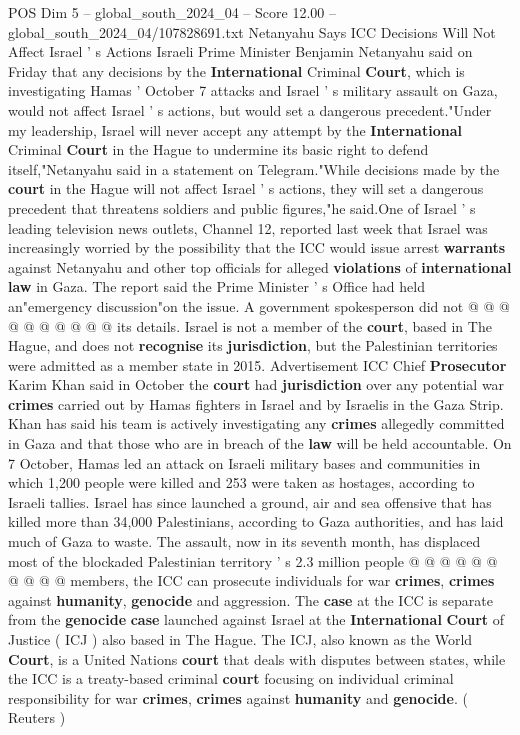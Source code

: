 \begin{textsample}{POS Dim 5 – global\_south\_2024\_04 – Score 12.00 – global\_south\_2024\_04/107828691.txt}  \label{ex:f5_pos_272}
Netanyahu Says ICC Decisions Will Not Affect Israel ' s Actions Israeli Prime Minister Benjamin Netanyahu said on Friday that any decisions by the \textbf{International} Criminal \textbf{Court}, which is investigating Hamas ' October 7 attacks and Israel ' s military assault on Gaza, would not affect Israel ' s actions, but would set a dangerous precedent."Under my leadership, Israel will never accept any attempt by the \textbf{International} Criminal \textbf{Court} in the Hague to undermine its basic right to defend itself,"Netanyahu said in a statement on Telegram."While decisions made by the \textbf{court} in the Hague will not affect Israel ' s actions, they will set a dangerous precedent that threatens soldiers and public figures,"he said.One of Israel ' s leading television news outlets, Channel 12, reported last week that Israel was increasingly worried by the possibility that the ICC would issue arrest \textbf{warrants} against Netanyahu and other top officials for alleged \textbf{violations} of \textbf{international} \textbf{law} in Gaza.
The report said the Prime Minister ' s Office had held an"emergency discussion"on the issue.
A government spokesperson did not @ @ @ @ @ @ @ @ @ @ its details.
Israel is not a member of the \textbf{court}, based in The Hague, and does not \textbf{recognise} its \textbf{jurisdiction}, but the Palestinian territories were admitted as a member state in 2015.
Advertisement ICC Chief \textbf{Prosecutor} Karim Khan said in October the \textbf{court} had \textbf{jurisdiction} over any potential war \textbf{crimes} carried out by Hamas fighters in Israel and by Israelis in the Gaza Strip.
Khan has said his team is actively investigating any \textbf{crimes} allegedly committed in Gaza and that those who are in breach of the \textbf{law} will be held accountable.
On 7 October, Hamas led an attack on Israeli military bases and communities in which 1,200 people were killed and 253 were taken as hostages, according to Israeli tallies.
Israel has since launched a ground, air and sea offensive that has killed more than 34,000 Palestinians, according to Gaza authorities, and has laid much of Gaza to waste.
The assault, now in its seventh month, has displaced most of the blockaded Palestinian territory ' s 2.3 million people @ @ @ @ @ @ @ @ @ @ members, the ICC can prosecute individuals for war \textbf{crimes}, \textbf{crimes} against \textbf{humanity}, \textbf{genocide} and aggression.
The \textbf{case} at the ICC is separate from the \textbf{genocide} \textbf{case} launched against Israel at the \textbf{International} \textbf{Court} of Justice ( ICJ ) also based in The Hague.
The ICJ, also known as the World \textbf{Court}, is a United Nations \textbf{court} that deals with disputes between states, while the ICC is a treaty-based criminal \textbf{court} focusing on individual criminal responsibility for war \textbf{crimes}, \textbf{crimes} against \textbf{humanity} and \textbf{genocide}. ( Reuters )

\end{textsample}
